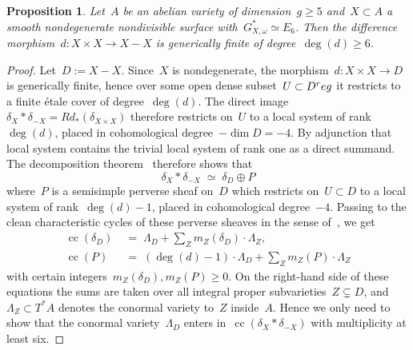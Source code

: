 \documentclass[a4paper]{amsart}
\newcommand{\reg}{\textup{reg}}
\DeclareMathOperator{\cc}{cc}
\renewcommand{\ge}{\geqslant}
\theoremstyle{plain}
\newtheorem{proposition}[theorem]{Proposition}
\theoremstyle{definition}
\numberwithin{equation}{section}
\begin{document}
\begin{proposition} \label{Prop:DegreeOfDifferenceMorphism} 
Let~$A$ be an abelian variety of dimension~$g\ge 5$ and~$X\subset A$ a smooth nondegenerate nondivisible surface with~$G_{X,\omega}^\ast \simeq E_6$. Then the difference morphism~$d \colon X \times X \to X-X$ is generically finite of degree~$\deg(d)\ge 6$.
\end{proposition}


\begin{proof} 
Let~$D:=X-X$. Since~$X$ is nondegenerate, the morphism~$d \colon X\times X \to D$ is generically finite, hence over some open dense subset~$U\subset D^\reg$ it restricts to a finite \'etale cover of degree~$\deg(d)$. The direct image~$\delta_X*\delta_{-X} = Rd_*(\delta_{X\times X})$ therefore restricts on~$U$ to a local system of rank~$\deg(d)$, placed in cohomological degree~$-\dim D = -4$. By adjunction that local system contains the trivial local system of rank one as a direct summand. The decomposition theorem~\cite[th.~6.2.5]{BBDG} therefore shows that
%
\begin{equation} \label{eq:geometry1} \tag{1a}
 \delta_X * \delta_{-X} \;\simeq\; \delta_D \oplus P 
\end{equation}
%
where~$P$ is a semisimple perverse sheaf on~$D$ which restricts on~$U \subset D$ to a local system of rank~$\deg(d)-1$, placed in cohomological degree~$-4$. Passing to the clean characteristic cycles of these perverse sheaves in the sense of~\cite[sect.~5.3]{JKLM}, we get
%
\begin{align} \label{eq:geometry2} \tag{1b}
 \cc(\delta_D) &\;=\; \Lambda_D + \sum_{Z} m_Z(\delta_D) \cdot \Lambda_Z, \\ \label{eq:geometry3} \tag{1c}
 \cc(P) &\;=\; (\deg(d)-1) \cdot \Lambda_D + \sum_Z m_Z(P)\cdot  \Lambda_Z
\end{align}
%
with certain integers~$m_Z(\delta_D), m_Z(P)\ge 0$. On the right-hand side of these equations the sums are taken over all integral proper subvarieties~$Z\subsetneq D$, and~$\Lambda_Z \subset T^*A$ denotes the conormal variety to~$Z$ inside~$A$. Hence we only need to show that the conormal variety~$\Lambda_D$ enters in~$\cc(\delta_X * \delta_{-X})$ with multiplicity at least six.

\medskip 


\end{proof}
\end{document}

